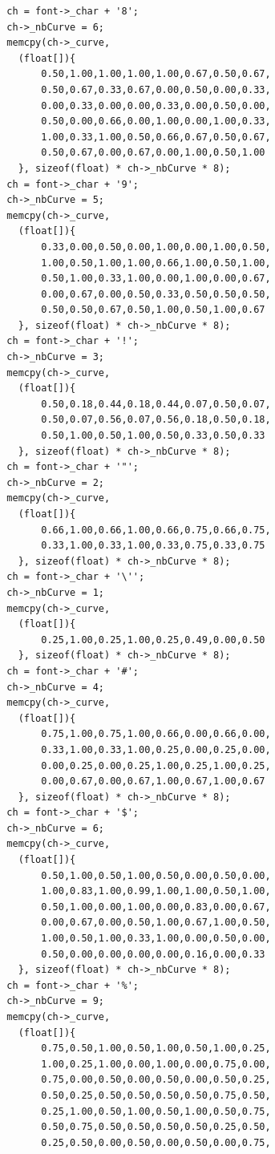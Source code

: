 \documentclass[12pt, a4paper]{article}
\begin{document}
\begin{scriptsize}
\begin{ttfamily}
\begin{lstlisting}
  ch = font->_char + '8';
  ch->_nbCurve = 6;
  memcpy(ch->_curve, 
    (float[]){
        0.50,1.00,1.00,1.00,1.00,0.67,0.50,0.67,
        0.50,0.67,0.33,0.67,0.00,0.50,0.00,0.33,
        0.00,0.33,0.00,0.00,0.33,0.00,0.50,0.00,
        0.50,0.00,0.66,0.00,1.00,0.00,1.00,0.33,
        1.00,0.33,1.00,0.50,0.66,0.67,0.50,0.67,
        0.50,0.67,0.00,0.67,0.00,1.00,0.50,1.00
    }, sizeof(float) * ch->_nbCurve * 8);
  ch = font->_char + '9';
  ch->_nbCurve = 5;
  memcpy(ch->_curve, 
    (float[]){
        0.33,0.00,0.50,0.00,1.00,0.00,1.00,0.50,
        1.00,0.50,1.00,1.00,0.66,1.00,0.50,1.00,
        0.50,1.00,0.33,1.00,0.00,1.00,0.00,0.67,
        0.00,0.67,0.00,0.50,0.33,0.50,0.50,0.50,
        0.50,0.50,0.67,0.50,1.00,0.50,1.00,0.67
    }, sizeof(float) * ch->_nbCurve * 8);
  ch = font->_char + '!';
  ch->_nbCurve = 3;
  memcpy(ch->_curve, 
    (float[]){
        0.50,0.18,0.44,0.18,0.44,0.07,0.50,0.07,
        0.50,0.07,0.56,0.07,0.56,0.18,0.50,0.18,
        0.50,1.00,0.50,1.00,0.50,0.33,0.50,0.33
    }, sizeof(float) * ch->_nbCurve * 8);
  ch = font->_char + '"';
  ch->_nbCurve = 2;
  memcpy(ch->_curve, 
    (float[]){
        0.66,1.00,0.66,1.00,0.66,0.75,0.66,0.75,
        0.33,1.00,0.33,1.00,0.33,0.75,0.33,0.75
    }, sizeof(float) * ch->_nbCurve * 8);
  ch = font->_char + '\'';
  ch->_nbCurve = 1;
  memcpy(ch->_curve, 
    (float[]){
        0.25,1.00,0.25,1.00,0.25,0.49,0.00,0.50
    }, sizeof(float) * ch->_nbCurve * 8);
  ch = font->_char + '#';
  ch->_nbCurve = 4;
  memcpy(ch->_curve, 
    (float[]){
        0.75,1.00,0.75,1.00,0.66,0.00,0.66,0.00,
        0.33,1.00,0.33,1.00,0.25,0.00,0.25,0.00,
        0.00,0.25,0.00,0.25,1.00,0.25,1.00,0.25,
        0.00,0.67,0.00,0.67,1.00,0.67,1.00,0.67
    }, sizeof(float) * ch->_nbCurve * 8);
  ch = font->_char + '$';
  ch->_nbCurve = 6;
  memcpy(ch->_curve, 
    (float[]){
        0.50,1.00,0.50,1.00,0.50,0.00,0.50,0.00,
        1.00,0.83,1.00,0.99,1.00,1.00,0.50,1.00,
        0.50,1.00,0.00,1.00,0.00,0.83,0.00,0.67,
        0.00,0.67,0.00,0.50,1.00,0.67,1.00,0.50,
        1.00,0.50,1.00,0.33,1.00,0.00,0.50,0.00,
        0.50,0.00,0.00,0.00,0.00,0.16,0.00,0.33
    }, sizeof(float) * ch->_nbCurve * 8);
  ch = font->_char + '%';
  ch->_nbCurve = 9;
  memcpy(ch->_curve, 
    (float[]){
        0.75,0.50,1.00,0.50,1.00,0.50,1.00,0.25,
        1.00,0.25,1.00,0.00,1.00,0.00,0.75,0.00,
        0.75,0.00,0.50,0.00,0.50,0.00,0.50,0.25,
        0.50,0.25,0.50,0.50,0.50,0.50,0.75,0.50,
        0.25,1.00,0.50,1.00,0.50,1.00,0.50,0.75,
        0.50,0.75,0.50,0.50,0.50,0.50,0.25,0.50,
        0.25,0.50,0.00,0.50,0.00,0.50,0.00,0.75,

\end{lstlisting}
\end{ttfamily}
\end{scriptsize}
\end{document}
